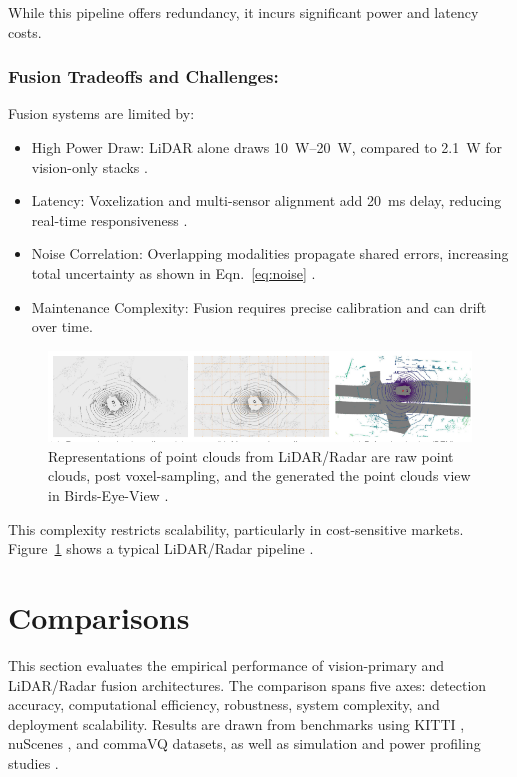 \documentclass[12pt]{article}
\begin{document}
While this pipeline offers redundancy, it incurs significant power and latency costs.

\subsubsection{Fusion Tradeoffs and Challenges:}

Fusion systems are limited by:

\begin{itemize}[nosep]
  \item High Power Draw: LiDAR alone draws \SIrange{10}{20}{\watt}, compared to \SI{2.1}{\watt} for vision-only stacks \autocite{Chen2024EndToEndAD}.
  \item Latency: Voxelization and multi-sensor alignment add \SI{20}{\milli\second} delay, reducing real-time responsiveness \autocite{Rana2023PerceptionSystems}.
  \item Noise Correlation: Overlapping modalities propagate shared errors,
		increasing total uncertainty as shown in Eqn.~\ref{eq:noise} \autocite{Rana2023PerceptionSystems}.
  \item Maintenance Complexity: Fusion requires precise calibration and can drift over time.
\end{itemize}
\begin{figure}[H]
	\centering
	\includegraphics[width=\textwidth]{voxels}
	\caption{Representations of point clouds from LiDAR/Radar are raw point
		clouds, post voxel-sampling, and the generated the point clouds view in
	Birds-Eye-View \cite{wang2024}.}
\label{fig:voxels}
\end{figure}

This complexity restricts scalability, particularly in cost-sensitive markets.
Figure~\ref{fig:voxels} shows a typical LiDAR/Radar pipeline \cite{wang2024}.

\section{Comparisons}

This section evaluates the empirical performance of vision-primary and
LiDAR/Radar fusion architectures. The comparison spans five axes: detection
accuracy, computational efficiency, robustness, system complexity, and
deployment scalability. Results are drawn from benchmarks using
KITTI \autocite{kitti}, nuScenes \autocite{nuscenes}, and commaVQ
\autocite{goff2025learningdriveworldmodel} datasets, as well as simulation and
power profiling studies \autocite{Rana2023PerceptionSystems}.
\end{document}
